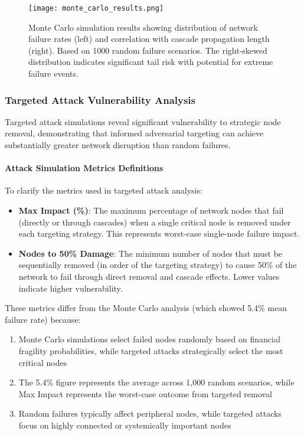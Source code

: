 \documentclass[a4 paper, 11pt,twoside]{article}
\newcommand{\0}{\Bf{0}}
\theoremstyle{definition}
\begin{document}
\begin{figure}[H]
\centering
\texttt{[image: monte\_carlo\_results.png]}
\caption{Monte Carlo simulation results showing distribution of network failure rates (left) and correlation with cascade propagation length (right). Based on 1000 random failure scenarios. The right-skewed distribution indicates significant tail risk with potential for extreme failure events.}
\end{figure}

\subsubsection{Targeted Attack Vulnerability Analysis}

Targeted attack simulations reveal significant vulnerability to strategic node removal, demonstrating that informed adversarial targeting can achieve substantially greater network disruption than random failures. 

\paragraph{Attack Simulation Metrics Definitions}

To clarify the metrics used in targeted attack analysis:

\begin{itemize}
\item \textbf{Max Impact (\%)}: The maximum percentage of network nodes that fail (directly or through cascades) when a single critical node is removed under each targeting strategy. This represents worst-case single-node failure impact.

\item \textbf{Nodes to 50\% Damage}: The minimum number of nodes that must be sequentially removed (in order of the targeting strategy) to cause 50\% of the network to fail through direct removal and cascade effects. Lower values indicate higher vulnerability.
\end{itemize}

These metrics differ from the Monte Carlo analysis (which showed 5.4\% mean failure rate) because:
\begin{enumerate}
\item Monte Carlo simulations select failed nodes randomly based on financial fragility probabilities, while targeted attacks strategically select the most critical nodes
\item The 5.4\% figure represents the average across 1,000 random scenarios, while Max Impact represents the worst-case outcome from targeted removal
\item Random failures typically affect peripheral nodes, while targeted attacks focus on highly connected or systemically important nodes
\end{enumerate}
\end{document}
